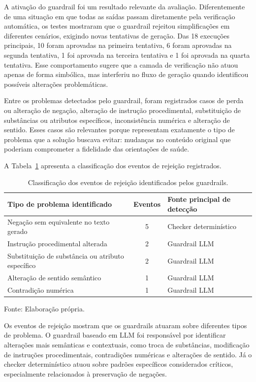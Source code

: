 A ativação do guardrail foi um resultado relevante da avaliação. Diferentemente de uma situação em que todas as saídas passam diretamente pela verificação automática, os testes mostraram que o guardrail rejeitou simplificações em diferentes cenários, exigindo novas tentativas de geração. Das 18 execuções principais, 10 foram aprovadas na primeira tentativa, 6 foram aprovadas na segunda tentativa, 1 foi aprovada na terceira tentativa e 1 foi aprovada na quarta tentativa. Esse comportamento sugere que a camada de verificação não atuou apenas de forma simbólica, mas interferiu no fluxo de geração quando identificou possíveis alterações problemáticas.

Entre os problemas detectados pelo guardrail, foram registrados casos de perda ou alteração de negação, alteração de instrução procedimental, substituição de substâncias ou atributos específicos, inconsistência numérica e alteração de sentido. Esses casos são relevantes porque representam exatamente o tipo de problema que a solução buscava evitar: mudanças no conteúdo original que poderiam comprometer a fidelidade das orientações de saúde.

A Tabela~\ref{tab:eventos-rejeicao-guardrails} apresenta a classificação dos eventos de rejeição registrados.

\begin{table}[htbp]
  \centering
  \caption{Classificação dos eventos de rejeição identificados pelos guardrails.}
  \label{tab:eventos-rejeicao-guardrails}
  \small
  \begin{tabularx}{\textwidth}{XcX}
    \toprule
    \textbf{Tipo de problema identificado} & \textbf{Eventos} & \textbf{Fonte principal de detecção} \\
    \midrule
    Negação sem equivalente no texto gerado & 5 & Checker determinístico \\
    Instrução procedimental alterada & 2 & Guardrail LLM \\
    Substituição de substância ou atributo específico & 2 & Guardrail LLM \\
    Alteração de sentido semântico & 1 & Guardrail LLM \\
    Contradição numérica & 1 & Guardrail LLM \\
    \bottomrule
  \end{tabularx}

  {\footnotesize Fonte: Elaboração própria.}
\end{table}

Os eventos de rejeição mostram que os guardrails atuaram sobre diferentes tipos de problema. O guardrail baseado em LLM foi responsável por identificar alterações mais semânticas e contextuais, como troca de substâncias, modificação de instruções procedimentais, contradições numéricas e alterações de sentido. Já o checker determinístico atuou sobre padrões específicos considerados críticos, especialmente relacionados à preservação de negações.

